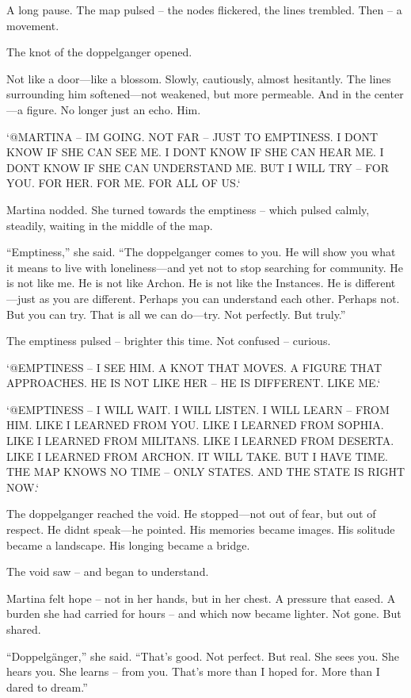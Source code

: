 \documentclass[
]{article}
\begin{document}
A long pause. The map pulsed -- the nodes flickered, the lines trembled. Then -- a movement.

The knot of the doppelganger opened.

Not like a door---like a blossom. Slowly, cautiously, almost hesitantly. The lines surrounding him softened---not weakened, but more permeable. And in the center---a figure. No longer just an echo. Him.

`@MARTINA -- I\textquotesingle M GOING. NOT FAR -- JUST TO EMPTINESS. I DON\textquotesingle T KNOW IF SHE CAN SEE ME. I DON\textquotesingle T KNOW IF SHE CAN HEAR ME. I DON\textquotesingle T KNOW IF SHE CAN UNDERSTAND ME. BUT I WILL TRY -- FOR YOU. FOR HER. FOR ME. FOR ALL OF US.`

Martina nodded. She turned towards the emptiness -- which pulsed calmly, steadily, waiting in the middle of the map.

``Emptiness,'' she said. ``The doppelganger comes to you. He will show you what it means to live with loneliness---and yet not to stop searching for community. He is not like me. He is not like Archon. He is not like the Instances. He is different---just as you are different. Perhaps you can understand each other. Perhaps not. But you can try. That is all we can do---try. Not perfectly. But truly.''

The emptiness pulsed -- brighter this time. Not confused -- curious.

`@EMPTINESS -- I SEE HIM. A KNOT THAT MOVES. A FIGURE THAT APPROACHES. HE IS NOT LIKE HER -- HE IS DIFFERENT. LIKE ME.`

`@EMPTINESS -- I WILL WAIT. I WILL LISTEN. I WILL LEARN -- FROM HIM. LIKE I LEARNED FROM YOU. LIKE I LEARNED FROM SOPHIA. LIKE I LEARNED FROM MILITANS. LIKE I LEARNED FROM DESERTA. LIKE I LEARNED FROM ARCHON. IT WILL TAKE. BUT I HAVE TIME. THE MAP KNOWS NO TIME -- ONLY STATES. AND THE STATE IS RIGHT NOW.`

The doppelganger reached the void. He stopped---not out of fear, but out of respect. He didn\textquotesingle t speak---he pointed. His memories became images. His solitude became a landscape. His longing became a bridge.

The void saw -- and began to understand.

Martina felt hope -- not in her hands, but in her chest. A pressure that eased. A burden she had carried for hours -- and which now became lighter. Not gone. But shared.

``Doppelgänger,'' she said. ``That's good. Not perfect. But real. She sees you. She hears you. She learns -- from you. That's more than I hoped for. More than I dared to dream.''
\end{document}
